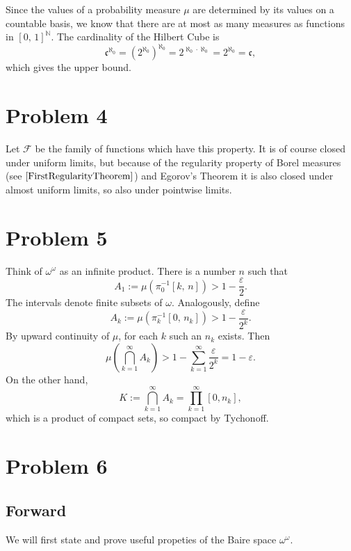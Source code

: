 Since the values of a probability measure \( \mu \) are determined by its values on a countable basis, we know that there are at most as many measures as functions in \( [0,\,1]^{ \mathbb{N} } \). The cardinality of the Hilbert Cube is
\[ 
    \mathfrak{c}^{\aleph_0} = \left( 2^{\aleph_0} \right)^{\aleph_0} = 2^{\aleph_0 \cdot \aleph_0} = 2^{\aleph_0} = \mathfrak{c}, 
\]
which gives the upper bound.

\section*{Problem 4}

Let \( \mathcal{F} \) be the family of functions which have this property. It is of course closed under uniform limits, but because of the regularity property of Borel measures (see \( \ref{FirstRegularityTheorem} \)) and Egorov's Theorem it is also closed under almost uniform limits, so also under pointwise limits.

\section*{Problem 5}

Think of \( \omega^{ \omega } \) as an infinite product. There is a number \( n \) such that
\[ 
    A_1 := \mu \left( \pi_0^{-1} \left[ k,\, n \right] \right) > 1 - \frac{\varepsilon }{2}.
\]
The intervals denote finite subsets of \( \omega \). Analogously, define
\[ 
    A_k := \mu \left( \pi_k^{-1} \left[ 0,\, n_k \right] \right) > 1 - \frac{\varepsilon }{2^k}.
\]
By upward continuity of \( \mu \), for each \( k \) such an \( n_k \) exists. Then
\[ 
    \mu \left( \bigcap_{k=1}^\infty A_k \right) > 1 - \sum_{k=1}^\infty \frac{\varepsilon }{2^k} = 1 -\varepsilon.
\]
On the other hand,
\[ 
    K := \bigcap_{k=1}^\infty A_k = \prod_{k=1}^\infty [0, n_k],
\]
which is a product of compact sets, so compact by Tychonoff.

\section*{Problem 6}

\subsection*{Forward}

We will first state and prove useful propeties of the Baire space \( \omega^\omega \).

